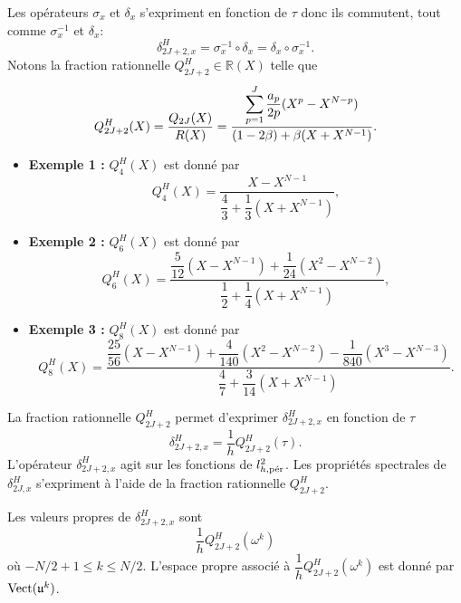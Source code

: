 Les opérateurs $\sigma_x$ et $\delta_{x}$ s’expriment en fonction de $\tau$ donc ils commutent, tout comme $\sigma_x^{-1}$ et $\delta_{x}$:
\begin{equation}
\delta_{2J+2,x}^H = \sigma_x^{-1} \circ \delta_{x} = \delta_{x} \circ \sigma_x^{-1}.
\end{equation}
Notons la fraction rationnelle $Q_{2J+2}^H \in \mathbb{R}(X)$ telle que 
\begin{equation}
Q_{2J+2}^H(X) = \dfrac{Q_{2J}(X)}{R(X)} = \dfrac{\gsum_{p=1}^J \dfrac{a_p}{2p} (X^p - X^{N-p})}{(1-2\beta) + \beta ( X + X^{N-1})}.
\label{eq:pol_hermitien}
\end{equation}
\begin{itemize}
\item \textbf{Exemple 1 :} $Q_4^H(X)$ est donné par
\begin{equation}
Q_4^H(X) = \dfrac{X-X^{N-1}}{\dfrac{4}{3} + \dfrac{1}{3}(X+X^{N-1})},
\label{eq:polhermi4}
\end{equation}
\item \textbf{Exemple 2 :} $Q_6^H(X)$ est donné par
\begin{equation}
Q_6^H(X) = \dfrac{\dfrac{5}{12}(X-X^{N-1}) + \dfrac{1}{24}(X^2-X^{N-2})}{\dfrac{1}{2} + \dfrac{1}{4}(X+X^{N-1})},
\end{equation}
\item \textbf{Exemple 3 :} $Q_8^H(X)$ est donné par
\begin{equation}
Q_8^H(X) = \dfrac{\dfrac{25}{56}(X-X^{N-1}) + \dfrac{4}{140}(X^2-X^{N-2}) - \dfrac{1}{840}(X^3-X^{N-3})}{\dfrac{4}{7} + \dfrac{3}{14}(X+X^{N-1})}.
\end{equation}
\end{itemize}

La fraction rationnelle $Q_{2J+2}^H$ permet d'exprimer $\delta_{2J+2,x}^H$ en fonction de $\tau$
\begin{equation}
\delta_{2J+2,x}^H = \dfrac{1}{h} Q_{2J+2}^H(\tau).
\end{equation}
L'opérateur $\delta_{2J+2,x}^H$ agit sur les fonctions de $l^2_{h,\per}$. Les propriétés spectrales de $\delta_{2J,x}^H$ s'expriment à l'aide de la fraction rationnelle $Q_{2J+2}^H$.

\begin{proposition}
Les valeurs propres de $\delta_{2J+2,x}^H$ sont 
\begin{equation}
\dfrac{1}{h} Q_{2J+2}^H (\omega^k)
\end{equation}
où $-N/2+1 \leq k \leq N/2$. L'espace propre associé à $\dfrac{1}{h} Q_{2J+2}^H (\omega^k)$ est donné par $\Vect( \mathfrak{u}^k )$.
\label{prop:eigen_mat_hermitien}
\end{proposition}

